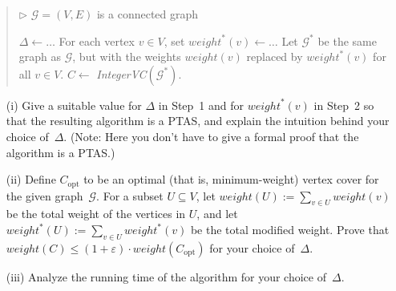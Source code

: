 \documentclass{article}
\newcommand{\G}{\ensuremath{\mathcal{G}}}
\newcommand{\graph}{\G}
\newcommand{\eps}{\varepsilon}
\renewcommand{\leq}{\leqslant}
\newcommand{\weight}{\mathit{weight}}
\newcommand{\optsub}{\mathrm{opt}}
\newcounter{rcounter}
\newenvironment{rlist}%
{\begin{list}{\setnr-\arabic{rcounter}}{\usecounter{rcounter}}}{\end{list}}
\begin{document}
\begin{rlist}
\begin{algorithm}
\begin{quotation}
				$\rhd$ $\graph=(V,E)$ is a connected graph \\[-5mm]
				\begin{algorithmic}[1]
					\State $\Delta \gets \ldots$
					\State For each vertex $v\in V$, set $\weight^*(v) \gets \ldots$
					\State Let $\graph^*$ be the same graph as $\graph$, but with the weights $\weight(v)$
					replaced by $\weight^*(v)$ for all $v\in V$.
					\State $C  \gets$ \emph{IntegerVC}$(\graph^*)$.
				\end{algorithmic}
			\end{quotation}
		\end{algorithm}
		\begin{enumerate}
			\item[(i)] Give a suitable value for $\Delta$ in Step~1 and for $\weight^*(v)$
			in Step~2 so that the resulting algorithm is a PTAS, and explain the intuition behind your choice of~$\Delta$. (Note: Here you don't have to give a formal proof
			that the algorithm is a PTAS.)
			\item[(ii)] Define $C_{\optsub}$ to be an optimal (that is, minimum-weight) vertex cover for the given graph~$\graph$.
			For a subset $U\subseteq V$, let $\weight(U):=\sum_{v\in U}\weight(v)$
			be the total weight of the vertices in $U$, and let
			$\weight^*(U):=\sum_{v\in U}\weight^*(v)$ be the total modified weight.
			Prove that $\weight(C) \leq (1+\eps)\cdot \weight(C_{\optsub})$ for your choice of~$\Delta$.
			\item[(iii)] Analyze the running time of the algorithm for your choice of~$\Delta$.
		\end{enumerate}
		

\end{rlist}
\end{document}

